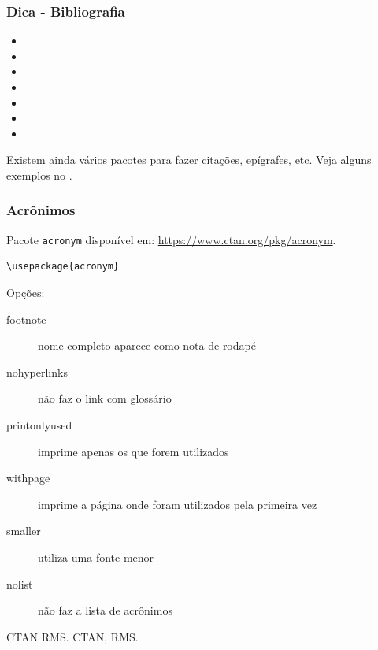 \begin{frame}
\frametitle{Dica - Bibliografia}

\begin{itemize}
 \item {}
 \item {}
 \item {}
 \item {}
 \item {} 
 \item {}
 \item {}
\end{itemize}

\vspace{3ex}
Existem ainda vários pacotes para fazer citações, epígrafes, etc.
Veja alguns exemplos no .

\end{frame}



\begin{frame}
\frametitle{Acrônimos}

Pacote \texttt{acronym} disponível em: \url{https://www.ctan.org/pkg/acronym}.

\begin{verbatim}
\usepackage{acronym}
\end{verbatim}



Opções:
\begin{description}
\item[footnote] nome completo aparece como nota de rodapé
\item[nohyperlinks] não faz o link com glossário 
\item[printonlyused] imprime apenas os que forem utilizados
\item[withpage] imprime a página onde foram utilizados pela primeira vez
\item[smaller] utiliza uma fonte menor
\item[nolist] não faz a lista de acrônimos
\end{description}


\begin{LTXexample}
\begin{acronym}
\end{acronym}

\lipsum[1][1-2] \ac{CTAN} \lipsum[1][3] \ac{RMS}.
\lipsum[1][4] \ac{CTAN}, \lipsum[1][5] \ac{RMS}.
\end{LTXexample}

\end{frame}
